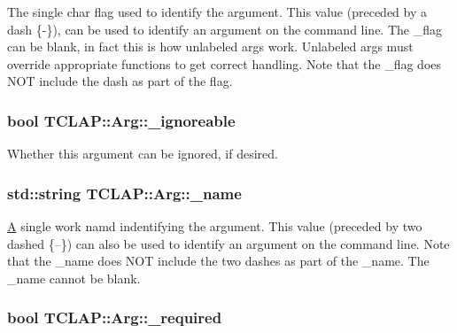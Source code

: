 The single char flag used to identify the argument. This value (preceded by a dash \{-\/\}), can be used to identify an argument on the command line. The \+\_\+flag can be blank, in fact this is how unlabeled args work. Unlabeled args must override appropriate functions to get correct handling. Note that the \+\_\+flag does N\+O\+T include the dash as part of the flag. \hypertarget{class_t_c_l_a_p_1_1_arg_a9832bb7564f4ab472bd51b7b1bbc683f}{
\subsubsection[{\+\_\+ignoreable}]{\setlength{\rightskip}{0pt plus 5cm}bool T\+C\+L\+A\+P\+::\+Arg\+::\+\_\+ignoreable\hspace{0.3cm}{\ttfamily [protected]}}}\label{class_t_c_l_a_p_1_1_arg_a9832bb7564f4ab472bd51b7b1bbc683f}
Whether this argument can be ignored, if desired. \hypertarget{class_t_c_l_a_p_1_1_arg_ac0f138057a99fb5d94ff4acb41a083aa}{
\subsubsection[{\+\_\+name}]{\setlength{\rightskip}{0pt plus 5cm}std\+::string T\+C\+L\+A\+P\+::\+Arg\+::\+\_\+name\hspace{0.3cm}{\ttfamily [protected]}}}\label{class_t_c_l_a_p_1_1_arg_ac0f138057a99fb5d94ff4acb41a083aa}
\hyperlink{class_a}{A} single work namd indentifying the argument. This value (preceded by two dashed \{--\}) can also be used to identify an argument on the command line. Note that the \+\_\+name does N\+O\+T include the two dashes as part of the \+\_\+name. The \+\_\+name cannot be blank. \hypertarget{class_t_c_l_a_p_1_1_arg_ad16408bd1ca4d8b1d14d6c5129545a84}{
\subsubsection[{\+\_\+required}]{\setlength{\rightskip}{0pt plus 5cm}bool T\+C\+L\+A\+P\+::\+Arg\+::\+\_\+required\hspace{0.3cm}{\ttfamily [protected]}}}\label{class_t_c_l_a_p_1_1_arg_ad16408bd1ca4d8b1d14d6c5129545a84}
